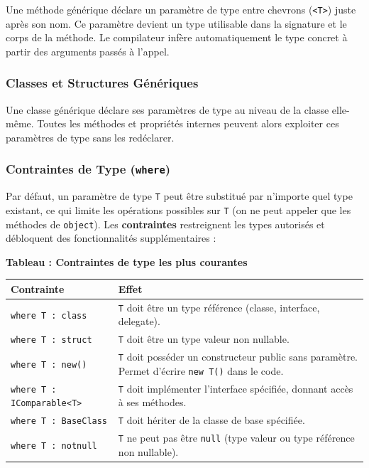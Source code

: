 Une méthode générique déclare un paramètre de type entre chevrons (\texttt{<T>}) juste après son nom. Ce paramètre devient un type utilisable dans la signature et le corps de la méthode. Le compilateur infère automatiquement le type concret à partir des arguments passés à l'appel.

\subsubsection{Classes et Structures Génériques}

Une classe générique déclare ses paramètres de type au niveau de la classe elle-même. Toutes les méthodes et propriétés internes peuvent alors exploiter ces paramètres de type sans les redéclarer.

\subsubsection{Contraintes de Type (\texttt{where})}

Par défaut, un paramètre de type \texttt{T} peut être substitué par n'importe quel type existant, ce qui limite les opérations possibles sur \texttt{T} (on ne peut appeler que les méthodes de \texttt{object}). Les \textbf{contraintes} restreignent les types autorisés et débloquent des fonctionnalités supplémentaires :

\begin{center}
    \textbf{Tableau : Contraintes de type les plus courantes} \\[0.3cm]
    \begin{tabular}{@{}lp{9cm}@{}}
        \toprule
        \textbf{Contrainte} & \textbf{Effet} \\
        \midrule
        \texttt{where T : class} & \texttt{T} doit être un type référence (classe, interface, delegate). \\
        \texttt{where T : struct} & \texttt{T} doit être un type valeur non nullable. \\
        \texttt{where T : new()} & \texttt{T} doit posséder un constructeur public sans paramètre. Permet d'écrire \texttt{new T()} dans le code. \\
        \texttt{where T : IComparable<T>} & \texttt{T} doit implémenter l'interface spécifiée, donnant accès à ses méthodes. \\
        \texttt{where T : BaseClass} & \texttt{T} doit hériter de la classe de base spécifiée. \\
        \texttt{where T : notnull} & \texttt{T} ne peut pas être \texttt{null} (type valeur ou type référence non nullable). \\
        \bottomrule
    \end{tabular}
\end{center}

